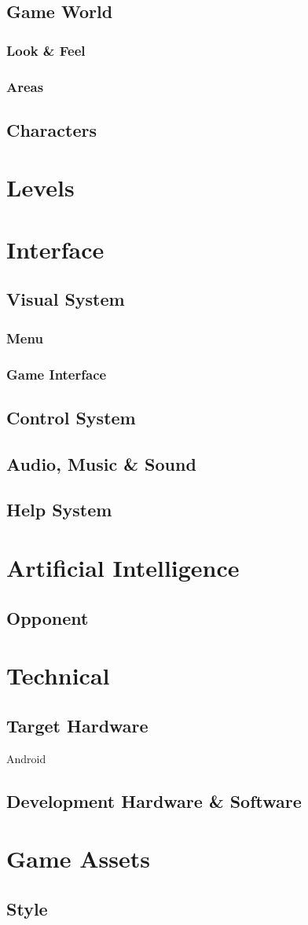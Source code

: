 \documentclass[12pt, letterpaper]{article}
\begin{document}
    \subsection{Game World}
        \subsubsection{Look \& Feel}
        \subsubsection{Areas}
    \subsection{Characters}
\section{Levels}
\section{Interface}
    \subsection{Visual System}
        \subsubsection{Menu}
        \subsubsection{Game Interface}
    \subsection{Control System}
    \subsection{Audio, Music \& Sound}
    \subsection{Help System}
\section{Artificial Intelligence}
    \subsection{Opponent}
\section{Technical}
    \subsection{Target Hardware}
    Android
    \subsection{Development Hardware \& Software}
\section{Game Assets}
    \subsection{Style}
\end{document}
